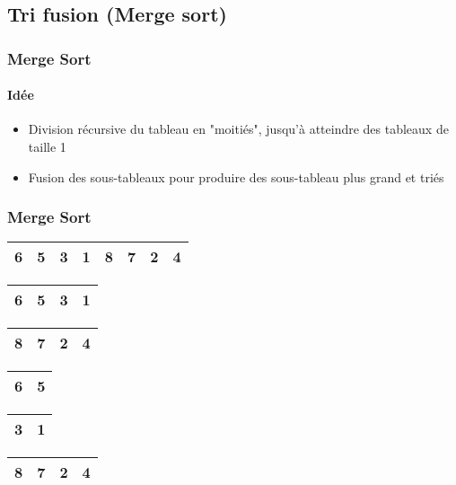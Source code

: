 \subsection[Merge]{Tri fusion (Merge sort)}

\begin{frame}
\frametitle{Merge Sort}
\framesubtitle{Idée}
\begin{itemize}
\item Division récursive du tableau en "moitiés", jusqu'à atteindre des tableaux de taille 1
\item Fusion des sous-tableaux pour produire des sous-tableau plus grand et triés
\end{itemize}
\end{frame}

\begin{frame}
\frametitle{Merge Sort}
\begin{table}
\begin{tabular}{| c | c | c | c | c | c | c | c |}
\hline
\cellcolor{blue!25}6 & \cellcolor{blue!25}5 & \cellcolor{blue!25}3 & \cellcolor{blue!25}1 & \cellcolor{blue!25}8 & \cellcolor{blue!25}7 & \cellcolor{blue!25}2 & \cellcolor{blue!25}4 \\ 
\hline
\end{tabular}
\end{table}

\begin{table}
\begin{tabular}{| c | c | c | c |}
\hline
\cellcolor{blue!25}6 & \cellcolor{blue!25}5 & \cellcolor{blue!25}3 & \cellcolor{blue!25}1 \\ 
\hline
\end{tabular}
\quad
\begin{tabular}{| c | c | c | c |}
\hline
8 & 7 & 2 & 4 \\ 
\hline
\end{tabular}
\end{table}

\begin{table}
\begin{tabular}{| c | c |}
\hline
\cellcolor{blue!25}6 & \cellcolor{blue!25}5 \\ 
\hline
\end{tabular}
\quad
\begin{tabular}{| c | c |}
\hline
3 & 1 \\ 
\hline
\end{tabular}
\quad
\begin{tabular}{| c | c | c | c |}
\hline
8 & 7 & 2 & 4 \\ 
\hline
\end{tabular}
\end{table}


\end{frame}
